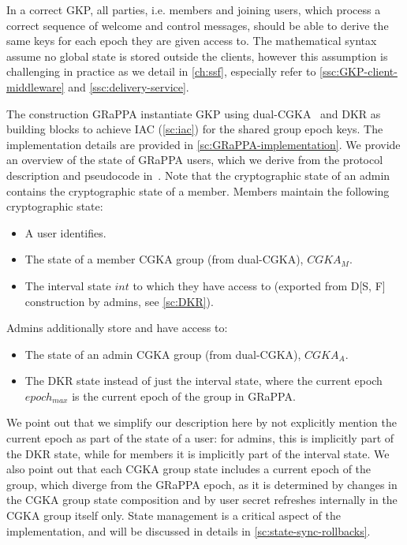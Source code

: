 In a correct GKP, all parties, i.e. members and joining users, which process a correct
sequence of welcome and control messages, should be able to derive the same keys
for each epoch they are given access to. The mathematical syntax assume
no global state is stored outside the clients, however this assumption is challenging
in practice as we detail in \cref{ch:ssf},
especially refer to \cref{ssc:GKP-client-middleware} and \cref{ssc:delivery-service}.

The construction GRaPPA instantiate GKP using dual-CGKA~\cite{USENIX:BalColVau23}
and DKR \cite{GKP} as building blocks to achieve IAC (\cref{sc:iac}) for the shared group epoch keys.
The implementation details are provided in \cref{sc:GRaPPA-implementation}.
We provide an overview of the state of GRaPPA users, which we derive from the protocol description and pseudocode in~\cite{GKP}. 
Note that the cryptographic state of an admin contains the cryptographic state of a member. 
Members maintain the following cryptographic state:
\begin{itemize}
    \item A user identifies.
    \item The state of a member CGKA group (from dual-CGKA), $CGKA_M$.
    \item The interval state $int$ to which they have access to (exported from D[S, F] construction by admins, see \cref{sc:DKR}).
\end{itemize}
Admins additionally store and have access to:
\begin{itemize}
    \item The state of an admin CGKA group (from dual-CGKA), $CGKA_A$.
    \item The DKR state instead of just the interval state, where the current epoch $epoch_{max}$ is the current epoch of the group in GRaPPA.
\end{itemize}
We point out that we simplify our description here by not explicitly mention the current epoch as part of the state of a user:
for admins, this is implicitly part of the DKR state, while for members it is implicitly part of the interval state.
We also point out that each CGKA group state includes a current epoch of the group,
which diverge from the GRaPPA epoch, as it is determined by changes in
the CGKA group state composition and by user secret refreshes internally in the
CGKA group itself only. State management is a critical aspect 
of the implementation, and will be discussed in details in \cref{sc:state-sync-rollbacks}.

